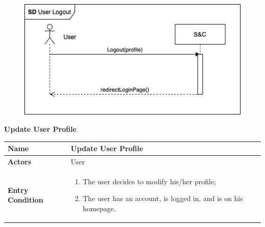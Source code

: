 \begin{enumerate}[label=\textbf{[US\arabic*]}, left = 0pt, align = left]
\begin{longtable}{|l|p{11cm}|}
            \end{longtable}

            \begin{figure}[h!]
                \centering
                    \includegraphics[width=1\textwidth]{RASD/Images/UseCases/UserLogout.drawio.png}
                \label{fig:example}
            \end{figure}

            \newpage
            
            \item \textbf{Update User Profile}
            
            \begin{longtable}{|l|p{11cm}|}  
                \hline
                \textbf{Name} & 
                    \textbf{Update User Profile} \\
                \hline
                
                \textbf{Actors} & 
                    User \\
                \hline

                \textbf{Entry Condition} & 
                    \begin{enumerate}[label=\textbullet, itemsep=0em]
                        \item The user decides to modify his/her profile;
                        \item The user has an account, is logged in, and is on his homepage.
                    \end{enumerate} \\
                \hline
                

\end{longtable}
\end{enumerate}
